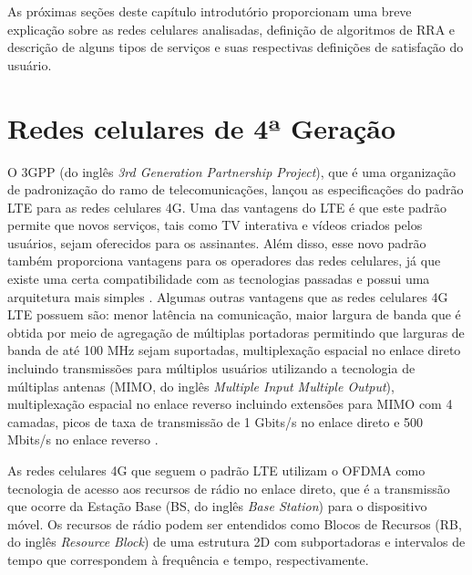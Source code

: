 As próximas seções deste capítulo introdutório proporcionam uma breve explicação sobre as redes celulares analisadas, definição de algoritmos de RRA e descrição de alguns tipos de serviços e suas respectivas definições de satisfação do usuário. 

\section{Redes celulares de 4ª Geração}

O 3GPP (do inglês \textit{3rd Generation Partnership Project}), que é uma organização de padronização do ramo de telecomunicações, lançou as especificações do padrão LTE para as redes celulares 4G. Uma das vantagens do \acs{LTE} é que este padrão permite que novos serviços, tais como TV interativa e vídeos criados pelos usuários, sejam oferecidos para os assinantes. Além disso, esse novo padrão também proporciona vantagens para os operadores das redes celulares, já que existe uma certa compatibilidade com as tecnologias passadas e possui uma arquitetura mais simples \cite{Lima2010}. Algumas outras vantagens que as redes celulares 4G LTE possuem são: menor latência na comunicação, maior largura de banda que é obtida por meio de agregação de múltiplas portadoras permitindo que larguras de banda de até 100 MHz sejam suportadas, multiplexação espacial no enlace direto incluindo transmissões para múltiplos usuários utilizando a tecnologia de múltiplas antenas (MIMO, do inglês \textit{Multiple Input Multiple Output}), multiplexação espacial no enlace reverso incluindo extensões para MIMO com 4 camadas, picos de taxa de transmissão de 1 Gbits/s no enlace direto e 500 Mbits/s no enlace reverso \cite{ghosh2010lte}. 

As redes celulares 4G que seguem o padrão LTE utilizam o \acs{OFDMA} como tecnologia de acesso aos recursos de rádio no enlace direto, que é a transmissão que ocorre da Estação Base (BS, do inglês \textit{Base Station}) para o dispositivo móvel. Os recursos de rádio podem ser entendidos como Blocos de Recursos (RB, do inglês \textit{Resource Block}) de uma estrutura 2D com subportadoras e intervalos de tempo que correspondem à frequência e tempo, respectivamente. 

